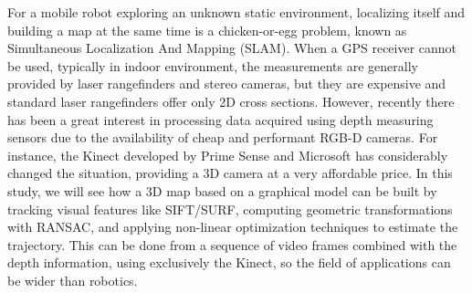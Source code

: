 For a mobile robot exploring an unknown static environment, localizing itself and building a map at the same time is a chicken-or-egg problem, known as Simultaneous Localization And Mapping (SLAM). When a GPS receiver cannot be used, typically in indoor environment, the measurements are generally provided by laser rangefinders and stereo cameras, but they are expensive and standard laser rangefinders offer only 2D cross sections. However, recently there has been a great interest in processing data acquired using depth measuring sensors due to the availability of cheap and performant RGB-D cameras. For instance, the Kinect  developed by Prime Sense and Microsoft has considerably changed the situation, providing a 3D camera at a very affordable price. In this study, we will see how a 3D map based on a graphical model can be built by tracking visual features like SIFT/SURF, computing geometric transformations with RANSAC, and applying non-linear optimization techniques to estimate the trajectory. This can be done from a sequence of video frames combined with the depth information, using exclusively the Kinect, so the field of applications can be wider than robotics. 

